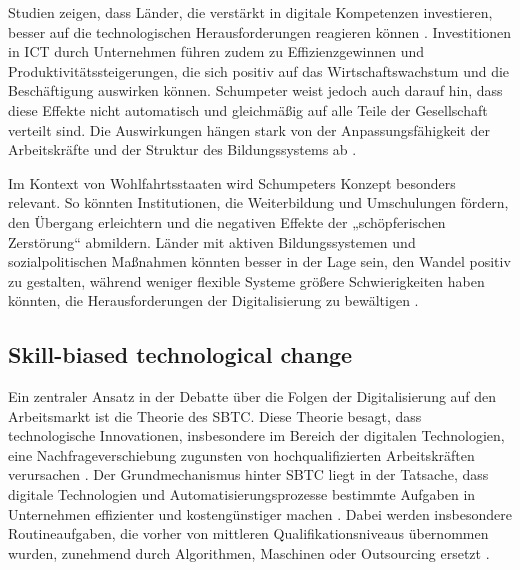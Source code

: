 Studien zeigen, dass Länder, die verstärkt in digitale Kompetenzen investieren, besser auf 
die technologischen Herausforderungen reagieren können 
\parencite[S. 15–17]{oecd2019measuring}. Investitionen in \ac{ICT} durch Unternehmen führen 
zudem zu Effizienzgewinnen und Produktivitätssteigerungen, die sich positiv auf das 
Wirtschaftswachstum und die Beschäftigung auswirken können. Schumpeter weist jedoch auch 
darauf hin, dass diese Effekte nicht automatisch und gleichmäßig auf alle Teile der 
Gesellschaft verteilt sind. Die Auswirkungen hängen stark von der Anpassungsfähigkeit der 
Arbeitskräfte und der Struktur des Bildungssystems ab \parencite[S. 48]{oecd2019measuring}.

Im Kontext von Wohlfahrtsstaaten wird Schumpeters Konzept besonders relevant. So könnten 
Institutionen, die Weiterbildung und Umschulungen fördern, den Übergang erleichtern und die 
negativen Effekte der „schöpferischen Zerstörung“ abmildern. Länder mit aktiven 
Bildungssystemen und sozialpolitischen Maßnahmen könnten besser in der Lage sein, den 
Wandel positiv zu gestalten, während weniger flexible Systeme größere Schwierigkeiten haben 
könnten, die Herausforderungen der Digitalisierung zu bewältigen 
\parencite[vgl.][S. 29–31]{espingandersen1990thethree}.


\subsection{Skill-biased technological change}

Ein zentraler Ansatz in der Debatte über die Folgen der Digitalisierung auf den 
Arbeitsmarkt ist die Theorie des \ac{SBTC}. Diese Theorie besagt, dass technologische 
Innovationen, insbesondere im Bereich der digitalen Technologien, eine 
Nachfrageverschiebung zugunsten von hochqualifizierten Arbeitskräften verursachen 
\parencite[vgl.][S. 1]{violante2008skill}. Der Grundmechanismus hinter \ac{SBTC} 
liegt in der Tatsache, dass digitale Technologien und Automatisierungsprozesse bestimmte 
Aufgaben in Unternehmen effizienter und kostengünstiger machen 
\parencite[vgl.][S. 2-3]{violante2008skill}. Dabei werden insbesondere 
Routineaufgaben, die vorher von mittleren Qualifikationsniveaus übernommen wurden, 
zunehmend durch Algorithmen, Maschinen oder Outsourcing ersetzt
\parencite[vgl.][S. 1279]{autor2003theskill}.

